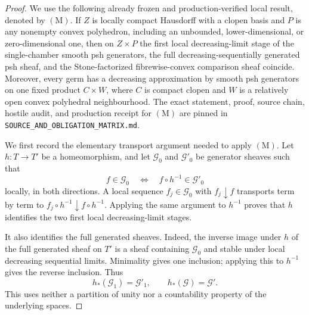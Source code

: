 
\begin{proof}
We use the following already frozen and production-verified local result,
denoted by \((\mathrm M)\).  If \(Z\) is locally compact Hausdorff with a
clopen basis and \(P\) is any nonempty convex polyhedron, including an
unbounded, lower-dimensional, or zero-dimensional one, then on
\(Z\times P\) the first local decreasing-limit stage of the
single-chamber smooth psh generators, the full decreasing-sequentially
generated psh sheaf, and the Stone-factorized fibrewise-convex comparison
sheaf coincide.  Moreover, every germ has a decreasing approximation by
smooth psh generators on one fixed product
\(C\times W\), where \(C\) is compact clopen and \(W\) is a relatively
open convex polyhedral neighbourhood.  The exact statement, proof, source
chain, hostile audit, and production receipt for \((\mathrm M)\) are pinned
in \texttt{SOURCE\_AND\_OBLIGATION\_MATRIX.md}.

We first record the elementary transport argument needed to apply
\((\mathrm M)\).  Let \(h:T\to T'\) be a homeomorphism, and let
\(\mathcal G_0\) and \(\mathcal G'_0\) be generator sheaves such that
\begin{equation}
                   f\in\mathcal G_0
             \quad\Longleftrightarrow\quad
                   f\circ h^{-1}\in\mathcal G'_0
 \label{eq:p071-complex-stage-zero-transport}
\end{equation}
locally, in both directions.  A local sequence
\(f_j\in\mathcal G_0\) with \(f_j\downarrow f\) transports term by term to
\(f_j\circ h^{-1}\downarrow f\circ h^{-1}\).  Applying the same argument
to \(h^{-1}\) proves that \(h\) identifies the two first local
decreasing-limit stages.

It also identifies the full generated sheaves.  Indeed, the inverse image
under \(h\) of the full generated sheaf on \(T'\) is a sheaf containing
\(\mathcal G_0\) and stable under local decreasing sequential limits.
Minimality gives one inclusion; applying this to \(h^{-1}\) gives the
reverse inclusion.  Thus
\begin{equation}
 h_*(\mathcal G_1)=\mathcal G'_1,
 \qquad
 h_*(\mathcal G)=\mathcal G'.
 \label{eq:p071-complex-all-stage-transport}
\end{equation}
This uses neither a partition of unity nor a countability property of the
underlying spaces.


\end{proof}
